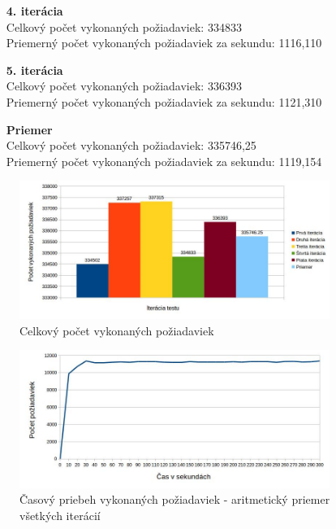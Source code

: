 \documentclass[12pt,oneside,final]{fithesis-utf8}
\begin{document}
\begin{itemize}
\begin{itemize}
\item[\textbf{4. iterácia}]\ \\
Celkový počet vykonaných požiadaviek: 334833\\
Priemerný počet vykonaných požiadaviek za sekundu: 1116,110

\item[\textbf{5. iterácia}]\ \\
Celkový počet vykonaných požiadaviek: 336393\\
Priemerný počet vykonaných požiadaviek za sekundu: 1121,310

\item[\textbf{Priemer}]\ \\
Celkový počet vykonaných požiadaviek: 335746,25\\
Priemerný počet vykonaných požiadaviek za sekundu: 1119,154

\end{itemize}

\begin{figure}[H]
  \centering
      \includegraphics[width=0.9\textwidth]{gatling3_2.jpg}
  \caption{Celkový počet vykonaných požiadaviek}
\end{figure}

\begin{figure}[H]
  \centering
      \includegraphics[width=0.9\textwidth]{gatling3_2_distr.jpg}
  \caption{Časový priebeh vykonaných požiadaviek - aritmetický priemer všetkých iterácií}
\end{figure}


\end{itemize}
\end{document}
